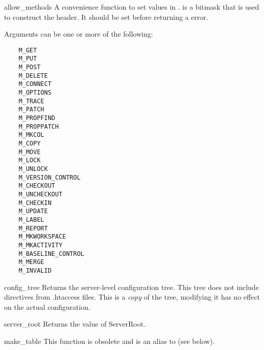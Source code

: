 \begin{funcdesc}{allow_methods}{}
  A convenience function to set values in .
   is a bitmask that is used to construct the
   header. It should be set before returning a
   error.

  Arguments can be one or more of the following:
  \begin{verbatim}
    M_GET
    M_PUT
    M_POST
    M_DELETE
    M_CONNECT
    M_OPTIONS
    M_TRACE
    M_PATCH
    M_PROPFIND
    M_PROPPATCH
    M_MKCOL
    M_COPY
    M_MOVE
    M_LOCK
    M_UNLOCK
    M_VERSION_CONTROL
    M_CHECKOUT
    M_UNCHECKOUT
    M_CHECKIN
    M_UPDATE
    M_LABEL
    M_REPORT
    M_MKWORKSPACE
    M_MKACTIVITY
    M_BASELINE_CONTROL
    M_MERGE
    M_INVALID
  \end{verbatim}

\end{funcdesc}

\begin{funcdesc}{config_tree}{}
  Returns the server-level configuration tree. This tree does not
  include directives from .htaccess files. This is a \emph{copy} of
  the tree, modifying it has no effect on the actual configuration.
\end{funcdesc}

\begin{funcdesc}{server_root}{}
  Returns the value of ServerRoot.
\end{funcdesc}

\begin{funcdesc}{make_table}{} 
  This function is obsolete and is an alias to  (see below).
\end{funcdesc}

